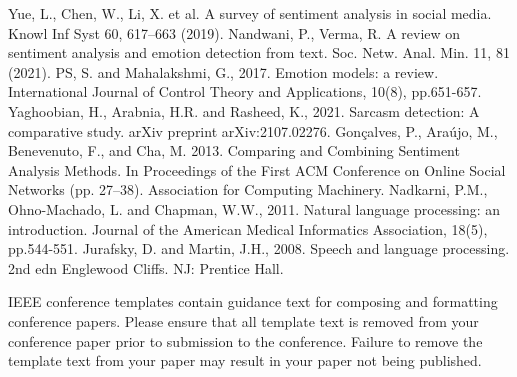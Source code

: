 \documentclass[conference]{IEEEtran}
\begin{document}
\begin{thebibliography}{00}
 Yue, L., Chen, W., Li, X. et al. A survey of sentiment analysis in social media. Knowl Inf Syst 60, 617–663 (2019).
 Nandwani, P., Verma, R. A review on sentiment analysis and emotion detection from text. Soc. Netw. Anal. Min. 11, 81 (2021).
 PS, S. and Mahalakshmi, G., 2017. Emotion models: a review. International Journal of Control Theory and Applications, 10(8), pp.651-657.
 Yaghoobian, H., Arabnia, H.R. and Rasheed, K., 2021. Sarcasm detection: A comparative study. arXiv preprint arXiv:2107.02276.
 Gonçalves, P., Araújo, M., Benevenuto, F., and Cha, M. 2013. Comparing and Combining Sentiment Analysis Methods. In Proceedings of the First ACM Conference on Online Social Networks (pp. 27–38). Association for Computing Machinery.
 Nadkarni, P.M., Ohno-Machado, L. and Chapman, W.W., 2011. Natural language processing: an introduction. Journal of the American Medical Informatics Association, 18(5), pp.544-551.
 Jurafsky, D. and Martin, J.H., 2008. Speech and language processing. 2nd edn Englewood Cliffs. NJ: Prentice Hall.
\end{thebibliography}
\vspace{12pt}
\color{red}
IEEE conference templates contain guidance text for composing and formatting conference papers. Please ensure that all template text is removed from your conference paper prior to submission to the conference. Failure to remove the template text from your paper may result in your paper not being published.
\end{document}
